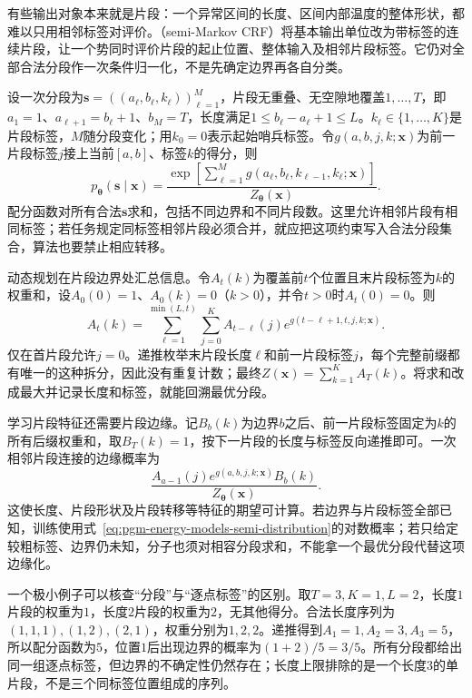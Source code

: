 有些输出对象本来就是片段：一个异常区间的长度、区间内部温度的整体形状，都难以只用相邻标签对评价。（semi-Markov CRF）将基本输出单位改为带标签的连续片段，让一个势同时评价片段的起止位置、整体输入及相邻片段标签。它仍对全部合法分段作一次条件归一化，不是先确定边界再各自分类。

设一次分段为$\bm{s}=((a_\ell,b_\ell,k_\ell))_{\ell=1}^M$，片段无重叠、无空隙地覆盖$1,\ldots,T$，即$a_1=1$、$a_{\ell+1}=b_\ell+1$、$b_M=T$，长度满足$1\leq b_\ell-a_\ell+1\leq L$。$k_\ell\in\{1,\ldots,K\}$是片段标签，$M$随分段变化；用$k_0=0$表示起始哨兵标签。令$g(a,b,j,k;\bm{x})$为前一片段标签$j$接上当前$[a,b]$、标签$k$的得分，则
\begin{equation}
  p_{\bm{\theta}}(\bm{s}\mid\bm{x})
   =\frac{\exp\!\left[
        \sum_{\ell=1}^M
          g(a_\ell,b_\ell,k_{\ell-1},k_\ell;\bm{x})
                    \right]}
          {Z_{\bm{\theta}}(\bm{x})}.
  \label{eq:pgm-energy-models-semi-distribution}
\end{equation}
配分函数对所有合法$\bm{s}$求和，包括不同边界和不同片段数。这里允许相邻片段有相同标签；若任务规定同标签相邻片段必须合并，就应把这项约束写入合法分段集合，算法也要禁止相应转移。

动态规划在片段边界处汇总信息。令$A_t(k)$为覆盖前$t$个位置且末片段标签为$k$的权重和，设$A_0(0)=1$、$A_0(k)=0$（$k>0$），并令$t>0$时$A_t(0)=0$。则
\begin{equation}
  A_t(k)=
    \sum_{\ell=1}^{\min(L,t)}\sum_{j=0}^K
       A_{t-\ell}(j)
       e^{g(t-\ell+1,t,j,k;\bm{x})}.
  \label{eq:pgm-energy-models-semi-forward}
\end{equation}
仅在首片段允许$j=0$。递推枚举末片段长度$\ell$和前一片段标签$j$，每个完整前缀都有唯一的这种拆分，因此没有重复计数；最终$Z(\bm{x})=\sum_{k=1}^KA_T(k)$。将求和改成最大并记录长度和标签，就能回溯最优分段。

学习片段特征还需要片段边缘。记$B_b(k)$为边界$b$之后、前一片段标签固定为$k$的所有后缀权重和，取$B_T(k)=1$，按下一片段的长度与标签反向递推即可。一次相邻片段连接的边缘概率为
\[
  \frac{A_{a-1}(j)
           e^{g(a,b,j,k;\bm{x})}B_b(k)}
       {Z_{\bm{\theta}}(\bm{x})}.
\]
这使长度、片段形状及片段转移等特征的期望可计算。若边界与片段标签全部已知，训练使用式~\eqref{eq:pgm-energy-models-semi-distribution}的对数概率；若只给定较粗标签、边界仍未知，分子也须对相容分段求和，不能拿一个最优分段代替这项边缘化。

一个极小例子可以核查“分段”与“逐点标签”的区别。取$T=3,K=1,L=2$，长度$1$片段的权重为$1$，长度$2$片段的权重为$2$，无其他得分。合法长度序列为$(1,1,1),(1,2),(2,1)$，权重分别为$1,2,2$。递推得到$A_1=1,A_2=3,A_3=5$，所以配分函数为$5$，位置$1$后出现边界的概率为$(1+2)/5=3/5$。所有分段都给出同一组逐点标签，但边界的不确定性仍然存在；长度上限排除的是一个长度$3$的单片段，不是三个同标签位置组成的序列。

